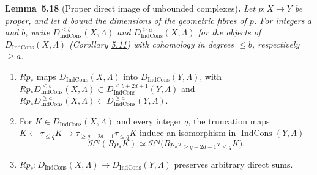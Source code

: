 \documentclass[11pt]{article}
\newenvironment{bpstatement}[2]{\par\addvspace{0.6\baselineskip}\noindent\textbf{#1}#2\textbf{.}\enspace\ignorespaces}
  {\par\addvspace{0.4\baselineskip}}
\newenvironment{bpstatementit}[2]{\begin{bpstatement}{#1}{#2}\itshape\ignorespaces}{\end{bpstatement}}
\providecommand{\Dic}{}\renewcommand{\Dic}{D_{\IndCons}}
\providecommand{\IndCons}{}\renewcommand{\IndCons}{\operatorname{IndCons}}
\begin{document}
\label{bp61}%
\begin{bpstatementit}{Lemma~5.18}{ (Proper direct image of unbounded complexes)}
Let \(p:X\to Y\) be proper, and let \(d\) bound the dimensions of the geometric fibres of \(p\). For integers \(a\) and \(b\), write \(\Dic^{\leq b}(X,\Lambda)\) and \(\Dic^{\geq a}(X,\Lambda)\) for the objects of \(\Dic(X,\Lambda)\) (Corollary \hyperref[bp33]{5.11}) with cohomology in degrees \(\leq b\), respectively \(\geq a\).

\begin{enumerate}
\item \(Rp_*\) maps \(\Dic(X,\Lambda)\) into \(\Dic(Y,\Lambda)\), with \(Rp_*\Dic^{\leq b}(X,\Lambda)\subset\Dic^{\leq b+2d+1}(Y,\Lambda)\) and \(Rp_*\Dic^{\geq a}(X,\Lambda)\subset\Dic^{\geq a}(Y,\Lambda)\).
\item For \(K\in\Dic(X,\Lambda)\) and every integer \(q\), the truncation maps \(K\leftarrow\tau_{\leq q}K\to\tau_{\geq q-2d-1}\tau_{\leq q}K\) induce an isomorphism in \(\IndCons(Y,\Lambda)\) \[
   \mathcal H^q(Rp_*K)\simeq
   \mathcal H^q\bigl(Rp_*\tau_{\geq q-2d-1}\tau_{\leq q}K\bigr).
   \tag{5.6}
   \]
\item \(Rp_*:\Dic(X,\Lambda)\to\Dic(Y,\Lambda)\) preserves arbitrary direct sums.
\end{enumerate}
\end{bpstatementit}
\end{document}
